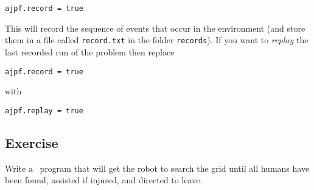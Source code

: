 \begin{verbatim}
ajpf.record = true
\end{verbatim}

This will record the sequence of events that occur in the environment
(and store them in a file called \texttt{record.txt} in the folder
\texttt{records}).  If you want to \emph{replay} the last recorded run
of the problem then replace 

\begin{verbatim}
ajpf.record = true
\end{verbatim}

with 

\begin{verbatim}
ajpf.replay = true
\end{verbatim}

\subsection{Exercise}
Write a \gwendolen\ program that will get the robot to search the grid
until all humans have been found, assisted if injured, and directed to
leave. 

